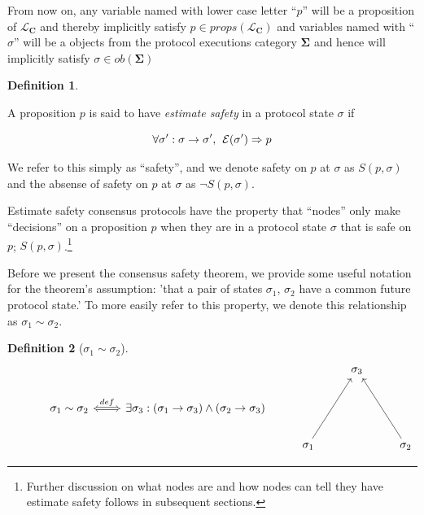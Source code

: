 \documentclass{article}
\theoremstyle{definition}
\newtheorem{defn}{Definition}[section]
\newcommand{\cat}{
	\mathbf
}
\begin{document}
From now on, any variable named with lower case letter ``$p$'' will be a proposition of $\mathcal{L}_\cat{C}$ and thereby implicitly satisfy $p \in props(\mathcal{L}_\cat{C})$ and variables named with ``$\sigma$'' will be a objects from the protocol executions category $\cat{\Sigma}$ and hence will implicitly satisfy $\sigma \in ob(\cat{\Sigma})$

\vspace{5mm}

\begin{defn}
\begin{description}
A proposition $p$ is said to have \emph{estimate safety} in a protocol state $\sigma$ if 

$$
\forall \sigma':\sigma \to \sigma',\hspace{1.5mm} \mathcal{E}(\sigma') \Rightarrow p
$$
\end{description}
\end{defn}

We refer to this simply as ``safety'', and we denote safety on $p$ at $\sigma$ as $S(p,\sigma)$ and the absense of safety on $p$ at $\sigma$ as $\neg{S(p,\sigma)}$.

Estimate safety consensus protocols have the property that ``nodes'' only make ``decisions'' on a proposition $p$ when they are in a protocol state $\sigma$ that is safe on $p$; $S(p,\sigma)$.\footnote{Further discussion on what nodes are and how nodes can tell they have estimate safety follows in subsequent sections.}

Before we present the consensus safety theorem, we provide some useful notation for the theorem's assumption: 'that a pair of states $\sigma_1$, $\sigma_2$ have a common future protocol state.' To more easily refer to this property, we denote this relationship as $\sigma_1 \sim \sigma_2$.

\begin{defn}[$\sigma_1 \sim \sigma_2$]
\begin{equation*}
\begin{tikzcd}
{}
  &
{}  
  &
{}  
  &
{}
  &
\sigma_3
  &
{}
  \\
{}
  &
\sigma_1 \sim \sigma_2
  \arrow[r,Leftrightarrow, "def"]
  &
\exists \sigma_3:(\sigma_1 \to \sigma_3) \land (\sigma_2 \to \sigma_3)
  &
{}  
  &
{}
  &
{}
  \\
{}  
  &
{}  
  &
{}
  &
\sigma_1
  \arrow[uur,""]
  &
{}
  &
\sigma_2
  \arrow[uul,""]
\end{tikzcd}
\end{equation*}
\end{defn}
\end{document}
